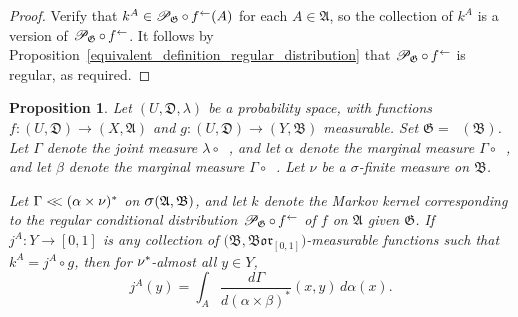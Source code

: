 \documentclass[
twoside=true,
paper=letter,
fontsize=9pt,
pagesize=auto,
leqno,
openany,
headsepline,
overfullrule,
]{scrbook}
\theoremstyle{plain}
\theoremstyle{plain}
\newtheorem{prop}[thm]{Proposition}
\theoremstyle{definition}
\theoremstyle{bfnoteitalic}
\theoremstyle{bfnoteroman}
\newcommand{\sigalg}[1]{\mathfrak{#1}}
\newcommand{\cali}[1]{\mathscr{#1}}
\newcommand{\condprobop}[1]{\mathop{\cali{P}\hspace{-1pt}}\nolimits_{#1}}
\newcommand{\borel}{\mathfrak{Bor}}
\newcommand{\sagb}{\mathop{\hbox{\large{$\sigma$}}}\nolimits}
\newcommand{\textsigma}{\hbox{\large{$\sigma$}}\kern-1pt}
\newcommand{\preimage}[1]{\mathop{#1^{\leftarrow}}}
\newcommand{\sigmaalgebra}{\sigalg{A}}
\newcommand{\sigmaalgebraii}{\sigalg{B}}
\newcommand{\productsig}[2]{\sagb(#1,#2)}
\newcommand{\kernast}{\ast\kern-1pt}
\newcommand{\funcf}{f}
\newcommand{\funcg}{g}
\newcommand{\funcj}{j}
\newcommand{\funck}{k}
\newcommand{\measurespace}{X}
\newcommand{\measurespaceii}{Y}
\newcommand{\mspaceelt}{x}
\newcommand{\mspaceeltii}{y}
\newcommand{\abscont}{\mathrel{< \kern-3.5pt <}}
\newcommand{\measnu}{\nu}
\newcommand{\measlambda}{\lambda}
\newcommand{\seti}{A}
\newcommand{\projectionone}{\pi_1}
\newcommand{\projectiontwo}{\pi_2}
\newcommand{\uspace}{U}%
\newcommand{\uspacesig}{\sigalg{D}}
\newcommand{\measonprod}{\Gamma}%
\newcommand{\marginalone}{\alpha}%
\newcommand{\marginaltwo}{\beta}%
\begin{document}
\begin{proof}
Verify that
$\funck^\seti \in \condprobop{\sigalg{G}}\circ \preimage{\funcf}(\seti)$ for each $\seti\in\sigmaalgebra$, so the collection of $\funck^\seti$ is a version of
$\condprobop{\sigalg{G}}\circ \preimage{\funcf}$. It follows by Proposition~\ref{equivalent_definition_regular_distribution} that
$\condprobop{\sigalg{G}}\circ \preimage{\funcf}$ is regular, as required.
\end{proof}



\begin{prop}\label{mixed_implies_bayes}
Let
$(\uspace, \uspacesig, \measlambda)$
be a probability space, with functions
$\funcf:(\uspace,\uspacesig)\to (\measurespace,\sigmaalgebra)$
and
$\funcg:(\uspace,\uspacesig)\to (\measurespaceii,\sigmaalgebraii)$
measurable.
Set
$\sigalg{G} = \preimage{\funcg}(\sigmaalgebraii)$.
Let $\measonprod$ denote the joint measure
$\measlambda\circ\preimage{({\funcf,\funcg})}$,
and let $\marginalone$  denote the marginal measure $\measonprod\circ \preimage{\projectionone}$,
and let $\marginaltwo$ denote the marginal measure $\measonprod\circ \preimage{\projectiontwo}$.
Let $\measnu$ be a \textsigma\hyp{}finite measure on $\sigmaalgebraii$.

Let
$\measonprod \abscont (\marginalone\times\measnu)^*$
on
$\productsig{\sigmaalgebra}{\sigmaalgebraii}$,
and let $\funck$ denote the Markov kernel corresponding to the regular conditional distribution
$\condprobop{\sigalg{G}}\circ \preimage{\funcf}$ of $\funcf$ on
$\sigmaalgebra$ given $\sigalg{G}$.
If
$\funcj^\seti : \measurespaceii \to [0,1]$
is any collection of
$\bigl( \sigmaalgebraii,\borel_{[0,1]} \bigr)$\hyp{}measurable
functions such that
$\funck^\seti = \funcj^\seti \circ \funcg$,
then for $\measnu^\kernast$\hyp{}almost all $\mspaceeltii\in\measurespaceii$,
\[
\funcj^\seti(\mspaceeltii)
=
\int_\seti
\dfrac{d\measonprod}{d(\marginalone\times\marginaltwo)^*}
(\mspaceelt,\mspaceeltii)\, d\marginalone(\mspaceelt).
\]
\end{prop}
\end{document}
